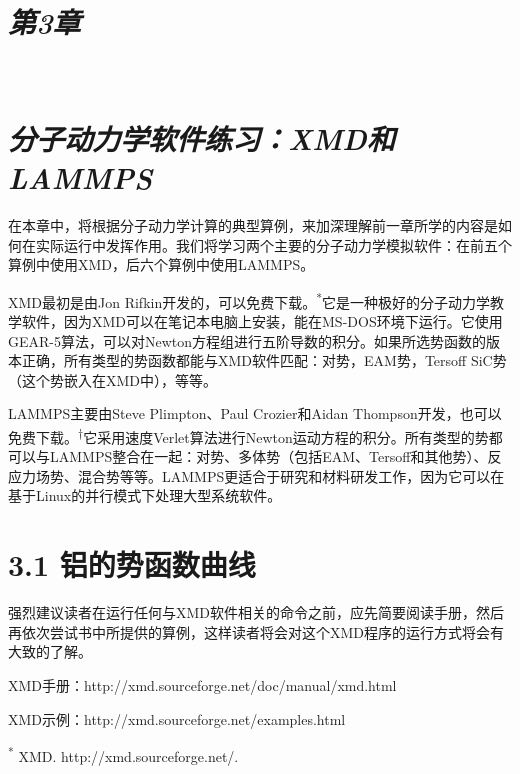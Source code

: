 \documentclass[
]{article}
\author{}
\date{}
\begin{document}
\hypertarget{ux7b2c3ux7ae0}{%
\section{\texorpdfstring{\emph{第3章}}{第3章}}\label{ux7b2c3ux7ae0}}

\emph{}

\hypertarget{ux5206ux5b50ux52a8ux529bux5b66ux8f6fux4ef6ux7ec3ux4e60xmdux548clammps}{%
\section{\texorpdfstring{\emph{分子动力学软件练习：XMD和LAMMPS}}{分子动力学软件练习：XMD和LAMMPS}}\label{ux5206ux5b50ux52a8ux529bux5b66ux8f6fux4ef6ux7ec3ux4e60xmdux548clammps}}

在本章中，将根据分子动力学计算的典型算例，来加深理解前一章所学的内容是如何在实际运行中发挥作用。我们将学习两个主要的分子动力学模拟软件：在前五个算例中使用XMD，后六个算例中使用LAMMPS。

XMD最初是由Jon
Rifkin开发的，可以免费下载。\textsuperscript{*}它是一种极好的分子动力学教学软件，因为XMD可以在笔记本电脑上安装，能在MS-DOS环境下运行。它使用GEAR-5算法，可以对Newton方程组进行五阶导数的积分。如果所选势函数的版本正确，所有类型的势函数都能与XMD软件匹配：对势，EAM势，Tersoff
SiC势（这个势嵌入在XMD中），等等。

LAMMPS主要由Steve Plimpton、Paul Crozier和Aidan
Thompson开发，也可以免费下载。\textsuperscript{†}它采用速度Verlet算法进行Newton运动方程的积分。所有类型的势都可以与LAMMPS整合在一起：对势、多体势（包括EAM、Tersoff和其他势）、反应力场势、混合势等等。LAMMPS更适合于研究和材料研发工作，因为它可以在基于Linux的并行模式下处理大型系统软件。

\hypertarget{ux94ddux7684ux52bfux51fdux6570ux66f2ux7ebf}{%
\section{3.1
铝的势函数曲线}\label{ux94ddux7684ux52bfux51fdux6570ux66f2ux7ebf}}

强烈建议读者在运行任何与XMD软件相关的命令之前，应先简要阅读手册，然后再依次尝试书中所提供的算例，这样读者将会对这个XMD程序的运行方式将会有大致的了解。

XMD手册：http://xmd.sourceforge.net/doc/manual/xmd.html

XMD示例：http://xmd.sourceforge.net/examples.html

\textsuperscript{*} XMD. http://xmd.sourceforge.net/.
\end{document}
